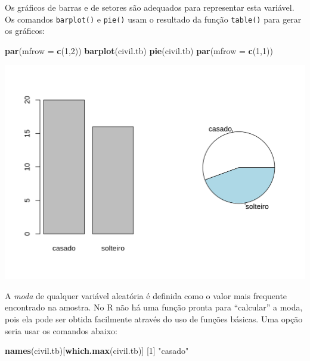 \documentclass[10pt,a4paper]{book}
\newenvironment{Shaded}{\begin{snugshade}}{\end{snugshade}}
\newcommand{\KeywordTok}[1]{\textcolor[rgb]{0.13,0.29,0.53}{\textbf{#1}}}
\newcommand{\DataTypeTok}[1]{\textcolor[rgb]{0.13,0.29,0.53}{#1}}
\newcommand{\DecValTok}[1]{\textcolor[rgb]{0.00,0.00,0.81}{#1}}
\newcommand{\StringTok}[1]{\textcolor[rgb]{0.31,0.60,0.02}{#1}}
\newcommand{\NormalTok}[1]{#1}
\begin{document}
Os gráficos de barras e de setores são adequados para representar esta
variável. Os comandos \texttt{barplot()} e \texttt{pie()} usam o
resultado da função \texttt{table()} para gerar os gráficos:

\begin{Shaded}
\begin{Highlighting}[]
\KeywordTok{par}\NormalTok{(}\DataTypeTok{mfrow =} \KeywordTok{c}\NormalTok{(}\DecValTok{1}\NormalTok{,}\DecValTok{2}\NormalTok{))}
\KeywordTok{barplot}\NormalTok{(civil.tb)}
\KeywordTok{pie}\NormalTok{(civil.tb)}
\KeywordTok{par}\NormalTok{(}\DataTypeTok{mfrow =} \KeywordTok{c}\NormalTok{(}\DecValTok{1}\NormalTok{,}\DecValTok{1}\NormalTok{))}
\end{Highlighting}
\end{Shaded}

\begin{center}\includegraphics{figures/unnamed-chunk-293-1} \end{center}

A \emph{moda} de qualquer variável aleatória é definida como o valor
mais frequente encontrado na amostra. No R não há uma função pronta para
``calcular'' a moda, pois ela pode ser obtida facilmente através do uso
de funções básicas. Uma opção seria usar os comandos abaixo:

\begin{Shaded}
\begin{Highlighting}[]
\KeywordTok{names}\NormalTok{(civil.tb)[}\KeywordTok{which.max}\NormalTok{(civil.tb)]}
\NormalTok{[}\DecValTok{1}\NormalTok{] }\StringTok{"casado"}
\end{Highlighting}
\end{Shaded}
\end{document}
